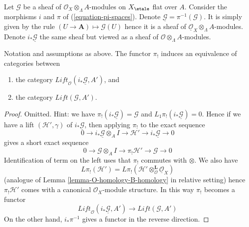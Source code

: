 \medskip\noindent
Let $\mathcal{G}$ be a sheaf of $\mathcal{O}_X \otimes_\Lambda A$-modules
on $X_\etale$ flat over $A$.
Consider the morphisms $i$ and $\pi$ of (\ref{equation-pi-spaces}).
Denote $\underline{\mathcal{G}} = \pi^{-1}(\mathcal{G})$. It is
simply given by the rule $(U \to \mathbf{A}) \mapsto \mathcal{G}(U)$
hence it is a sheaf of $\underline{\mathcal{O}}_X \otimes_\Lambda A$-modules.
Denote $i_*\underline{\mathcal{G}}$ the same sheaf but viewed as a
sheaf of $\mathcal{O} \otimes_\Lambda A$-modules.

\begin{lemma}
\label{lemma-second-equivalence}
Notation and assumptions as above.
The functor $\pi_!$ induces an equivalence of categories between
\begin{enumerate}
\item the category
$\textit{Lift}_\mathcal{O}(i_*\underline{\mathcal{G}}, A')$, and
\item the category $\textit{Lift}(\mathcal{G}, A')$.
\end{enumerate}
\end{lemma}

\begin{proof}
Omitted. Hint: we have
$\pi_!(i_*\underline{\mathcal{G}}) = \mathcal{G}$ and
$L_1\pi_!(i_*\underline{\mathcal{G}}) = 0$.
Hence if we have a lift $(\mathcal{H}', \gamma)$ of
$i_*\underline{\mathcal{G}}$, then applying $\pi_!$ to the exact
sequence
$$
0 \to i_*\underline{\mathcal{G}} \otimes_A I \to
\mathcal{H}' \to i_*\underline{\mathcal{G}} \to 0
$$
gives a short exact sequence
$$
0 \to \mathcal{G} \otimes_A I \to \pi_!\mathcal{H}' \to \mathcal{G} \to 0
$$
Identification of term on the left uses that
$\pi_!$ commutes with $\otimes$. We also have
$$
L\pi_!(\mathcal{H}') =
L\pi_!(\mathcal{H}' \otimes_\mathcal{O}^\mathbf{L} \underline{\mathcal{O}}_X)
$$
(analogue of Lemma \ref{lemma-O-homology-B-homology} in relative setting)
hence $\pi_!\mathcal{H}'$ comes with a canonical $\mathcal{O}_X$-module
structure. In this way $\pi_!$ becomes a functor
$$
\textit{Lift}_\mathcal{O}(i_*\underline{\mathcal{G}}, A')
\longrightarrow
\textit{Lift}(\mathcal{G}, A')
$$
On the other hand, $i_*\pi^{-1}$ gives a functor in the reverse
direction.
\end{proof}

